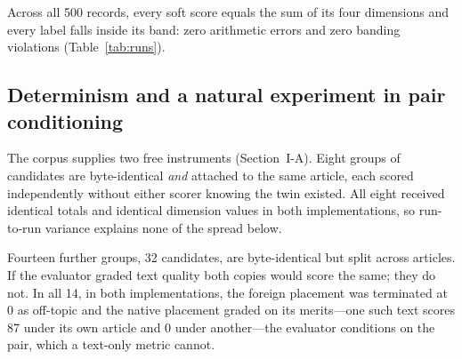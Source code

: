 \documentclass[conference]{IEEEtran}
\begin{document}
Across all 500 records, every soft score equals the sum of its four
dimensions and every label falls inside its band: zero arithmetic errors and
zero banding violations (Table~\ref{tab:runs}).

\subsection{Determinism and a natural experiment in pair conditioning}
The corpus supplies two free instruments (Section~I-A). Eight groups of candidates are byte-identical \emph{and} attached to the
same article, each scored independently without either scorer knowing the
twin existed. All eight received identical totals and identical dimension
values in both implementations, so run-to-run variance explains none of
the spread below.

Fourteen further groups, 32 candidates, are byte-identical but split
across articles. If the evaluator graded text quality both copies would
score the same; they do not. In all 14, in both implementations, the
foreign placement was terminated at
0 as off-topic and the native placement graded on its merits---one such text scores 87
under its own article and 0 under another---the evaluator conditions on
the pair, which a text-only metric cannot.
\end{document}

